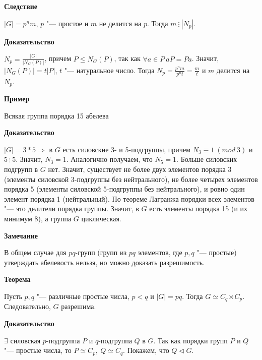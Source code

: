 \documentclass{article}
\begin{document}
\vspace{10pt}

\textbf{Следствие}

$|G| = p^nm$, $p$ "--- простое и $m$ не делится на $p$. Тогда $m \ \vdots \ |N_p|$.

\vspace{5pt}

\textbf{Доказательство}

$N_p = \frac{|G|}{|N_G(P)|}$, причем $P \leq N_G(P)$, так как $\forall a \in P \  aP = Pa$. Значит, $|N_G(P)| = t|P|$, $t$ "--- натуральное число. Тогда $N_p = \frac{p^nm}{p^nt} = \frac{m}{t}$ и $m$ делится на $N_p$.

\vspace{10pt}

\textbf{Пример}

Всякая группа порядка 15 абелева

\textbf{Доказательство}

$|G| = 3*5 \Rightarrow$ в $G$ есть силовские 3- и 5-подгруппы, причем $N_3 \equiv 1 \  (mod \  3)$ и $5 \ \vdots \ 5$. Значит, $N_3 = 1$. Аналогично получаем, что $N_5 = 1$. Больше силовских подгрупп в $G$ нет. Значит, существует не более двух элементов порядка 3 (элементы силовской 3-подгруппы без нейтрального), не более четырех элементов порядка 5 (элементы силовской 5-подгруппы без нейтрального), и ровно один элемент порядка 1 (нейтральный). По теореме Лагранжа порядки всех элементов "--- это делители порядка группы. Значит, в $G$ есть элементы порядка 15 (и их минимум 8), а группа $G$ циклическая.

\vspace{10pt}

\textbf{Замечание}

В общем случае для $pq$-групп (групп из $pq$ элементов, где $p, q$ "--- простые) утверждать абелевость нельзя, но можно доказать разрешимость.

\vspace{5pt}

\textbf{Теорема}

Пусть $p, q$ "--- различные простые числа, $p < q$ и $|G| = pq$. Тогда $G \simeq C_q \rtimes C_p$. Следовательно, $G$ разрешима.

\vspace{5pt}

\textbf{Доказательство}

$\exists$ силовская $p$-подгруппа $P$ и $q$-подгруппа $Q$ в $G$. Так как порядки групп $P$ и $Q$ "--- простые числа, то $P \simeq C_p, \  Q \simeq C_q$. Покажем, что $Q \triangleleft G$.
\end{document}
